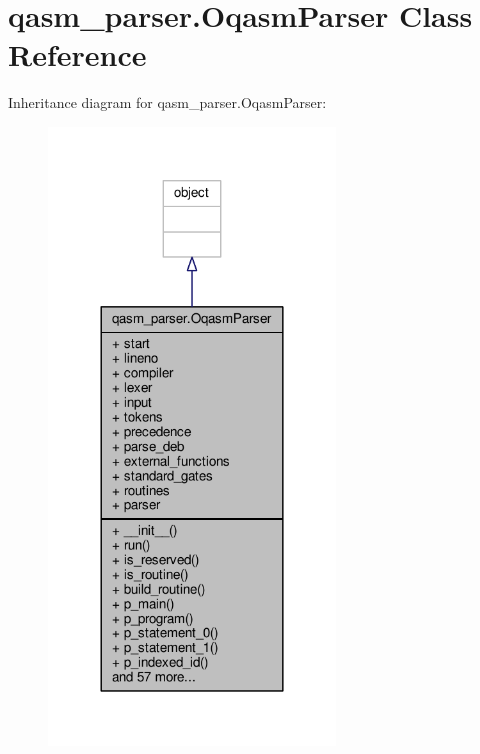 \hypertarget{classqasm__parser_1_1OqasmParser}{\section{qasm\-\_\-parser.\-Oqasm\-Parser Class Reference}
\label{classqasm__parser_1_1OqasmParser}
}


Inheritance diagram for qasm\-\_\-parser.\-Oqasm\-Parser\-:
\nopagebreak
\begin{figure}[H]
\begin{center}
\leavevmode
\includegraphics[width=216pt]{d1/de0/classqasm__parser_1_1OqasmParser__inherit__graph}
\end{center}
\end{figure}


